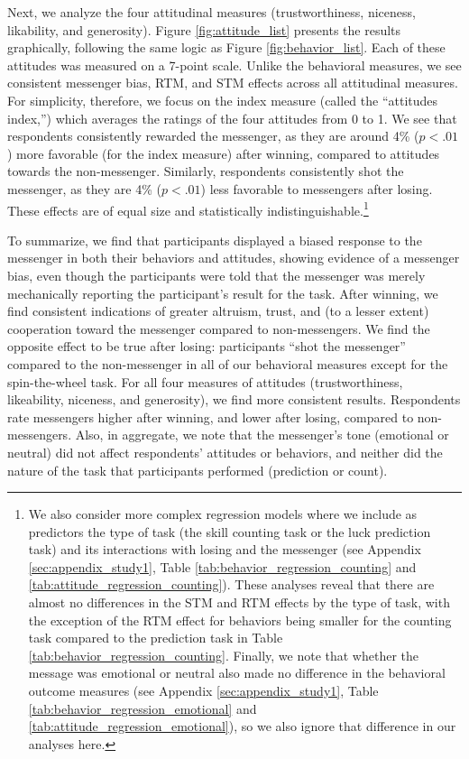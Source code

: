 Next, we analyze the four attitudinal measures (trustworthiness,
niceness, likability, and generosity). Figure \ref{fig:attitude_list} presents the results
graphically, following the same logic as Figure \ref{fig:behavior_list}. Each of these
attitudes was measured on a 7-point scale. Unlike the behavioral
measures, we see consistent messenger bias, RTM, and STM effects
across all attitudinal measures. For simplicity, therefore, we focus on
the index measure (called the ``attitudes index,'') which averages the
 ratings of the four attitudes from 0 to 1. We
see that respondents consistently rewarded the messenger, as they are
around 4\% ($p < .01$) more favorable (for the
index measure) after winning, compared to attitudes towards the
non-messenger. Similarly, respondents consistently shot the messenger,
as they are 4\% ($p < .01$) less favorable to
messengers after losing. These effects are of equal size and
statistically indistinguishable.\footnote{We also consider more complex regression models where we include as predictors the type of task (the skill counting task or the luck prediction task) and its interactions with losing and the messenger (see Appendix \ref{sec:appendix_study1}, Table \ref{tab:behavior_regression_counting} and \ref{tab:attitude_regression_counting}). These analyses reveal that there are almost no differences in the STM and RTM effects by the type of task, with the exception of the RTM effect for behaviors being smaller for the counting task compared to the prediction task in Table \ref{tab:behavior_regression_counting}. Finally, we note that whether the message was emotional or neutral also made no difference in the behavioral outcome measures (see Appendix \ref{sec:appendix_study1}, Table \ref{tab:behavior_regression_emotional} and \ref{tab:attitude_regression_emotional}), so we also ignore that difference in our analyses here.}

To summarize, we find that participants displayed a biased response to
the messenger in both their behaviors and attitudes, showing evidence of
a messenger bias, even though the participants were told that the
messenger was merely mechanically reporting the participant's result for
the task. After winning, we find consistent indications of greater
altruism, trust, and (to a lesser extent) cooperation toward the
messenger compared to non-messengers. We find the opposite effect to be
true after losing: participants ``shot the messenger'' compared to the
non-messenger in all of our behavioral measures except for the
spin-the-wheel task. For all four measures of attitudes
(trustworthiness, likeability, niceness, and generosity), we find more
consistent results. Respondents rate messengers higher after winning, and
lower after losing, compared to non-messengers. Also, in aggregate, we
note that the messenger's tone (emotional or neutral) did not affect
respondents' attitudes or behaviors, and neither did the nature of the
task that participants performed (prediction or count).

